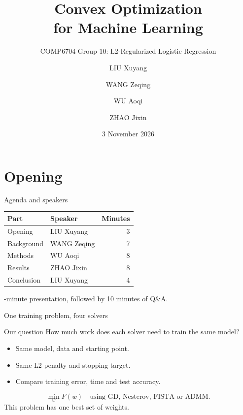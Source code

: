 \documentclass[10pt,aspectratio=169]{beamer}
\title{Convex Optimization\\for Machine Learning}
\subtitle{COMP6704 Group 10: L2-Regularized Logistic Regression}
\author{LIU Xuyang \and WANG Zeqing \and WU Aoqi \and ZHAO Jixin}
\institute[COMP]{Department of Computing, The Hong Kong Polytechnic University}
\date{3 November 2026}
\begin{document}
\begin{frame}
\titlepage
{}
\end{frame}

\section{Opening}

\begin{frame}{Agenda and speakers}
\centering
\renewcommand{\arraystretch}{1.35}
\begin{tabular}{llr}
\toprule
Part & Speaker & Minutes \\
\midrule
Opening & LIU Xuyang & 3 \\
Background & WANG Zeqing & 7 \\
Methods & WU Aoqi & 8 \\
Results & ZHAO Jixin & 8 \\
Conclusion & LIU Xuyang & 4 \\
\bottomrule
\end{tabular}
\par{}-minute presentation, followed by 10 minutes of Q\&A.
\end{frame}

\begin{frame}{One training problem, four solvers}
\begin{block}{Our question}
How much work does each solver need to train the same model?
\end{block}
\begin{itemize}
  \item Same model, data and starting point.
  \item Same L2 penalty and stopping target.
  \item Compare training error, time and test accuracy.
\end{itemize}
\[
\min_w F(w)
\quad\text{using GD, Nesterov, FISTA or ADMM.}
\]
This problem has one best set of weights.
\end{frame}
\end{document}
